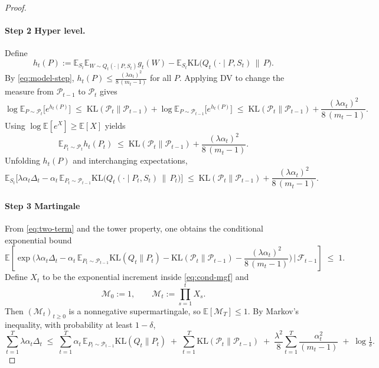 \documentclass{article}
\theoremstyle{plain}
\theoremstyle{definition}
\theoremstyle{remark}
\begin{document}
\begin{proof}
\paragraph{Step 2 Hyper level.} 
Define
\[
h_t(P):=\mathbb E_{S_t}\mathbb E_{W\sim Q_t(\cdot\mid P,S_t)} g_t(W)
-\mathbb E_{S_t}\mathrm{KL}\!\big(Q_t(\cdot\mid P,S_t)\,\|\,P\big).
\]
By \eqref{eq:model-step}, $h_t(P)\le \frac{(\lambda\alpha_t)^2}{8\,(m_t-1)}$ for all $P$.
Applying DV to change the measure from $\mathcal P_{t-1}$ to $\mathcal P_t$ gives
\begin{equation}
\label{eq:dv-p}
\log\mathbb E_{P\sim\mathcal P_t}\!\big[e^{h_t(P)}\big]
\;\le\; \mathrm{KL}(\mathcal P_t\|\mathcal P_{t-1})
+\log\mathbb E_{P\sim\mathcal P_{t-1}}\!\big[e^{h_t(P)}\big]
\;\le\; \mathrm{KL}(\mathcal P_t\|\mathcal P_{t-1})
+\frac{(\lambda\alpha_t)^2}{8\,(m_t-1)}.
\end{equation}
Using $\log\mathbb E[e^X]\ge \mathbb E[X]$ yields
\begin{equation}
\label{eq:p-expect}
\mathbb E_{P_t\sim\mathcal P_t} h_t(P_t)
\;\le\; \mathrm{KL}(\mathcal P_t\|\mathcal P_{t-1})
+\frac{(\lambda\alpha_t)^2}{8\,(m_t-1)}.
\end{equation}
Unfolding $h_t(P)$ and interchanging expectations,
\begin{equation}
\label{eq:two-term}
\mathbb E_{S_t}\Big[
\lambda\alpha_t\Delta_t
-\alpha_t\,\mathbb E_{P_t\sim\mathcal P_{t-1}}\mathrm{KL}\!\big(Q_t(\cdot\mid P_t,S_t)\,\|\,P_t\big)
\Big]
\;\le\;
\mathrm{KL}(\mathcal P_t\|\mathcal P_{t-1})
+\frac{(\lambda\alpha_t)^2}{8\,(m_t-1)}.
\end{equation}

\paragraph{Step 3 Martingale}
From \eqref{eq:two-term} and the tower property, one obtains the conditional exponential bound
\begin{equation}
\label{eq:cond-mgf}
\mathbb E\!\left[
\exp\!\Big(
\lambda\alpha_t\Delta_t
-\alpha_t\,\mathbb E_{P_t\sim\mathcal P_{t-1}}\mathrm{KL}(Q_t\|P_t)
-\mathrm{KL}(\mathcal P_t\|\mathcal P_{t-1})
-\frac{(\lambda\alpha_t)^2}{8\,(m_t-1)}
\Big)\,\Big|\,\mathcal F_{t-1}\right]\;\le\;1.
\end{equation}
Define $X_t$ to be the exponential increment inside \eqref{eq:cond-mgf} and
\[
\mathcal{M}_0:=1,\qquad
\mathcal{M}_t:=\prod_{s=1}^t X_s.
\]
Then $(\mathcal{M}_t)_{t\ge0}$ is a nonnegative supermartingale, so
$\mathbb E[\mathcal{M}_T]\le 1$.
By Markov's inequality, with probability at least $1-\delta$,
\begin{equation}
\label{eq:hpp}
\sum_{t=1}^T \lambda\alpha_t\Delta_t
\;\le\;
\sum_{t=1}^T \alpha_t\,\mathbb E_{P_t\sim\mathcal P_{t-1}}\mathrm{KL}(Q_t\|P_t)
\;+\; \sum_{t=1}^T \mathrm{KL}(\mathcal P_t\|\mathcal P_{t-1})
\;+\; \frac{\lambda^2}{8}\sum_{t=1}^T \frac{\alpha_t^2}{(m_t-1)}
\;+\; \log\tfrac1\delta.
\end{equation}


\end{proof}
\end{document}
